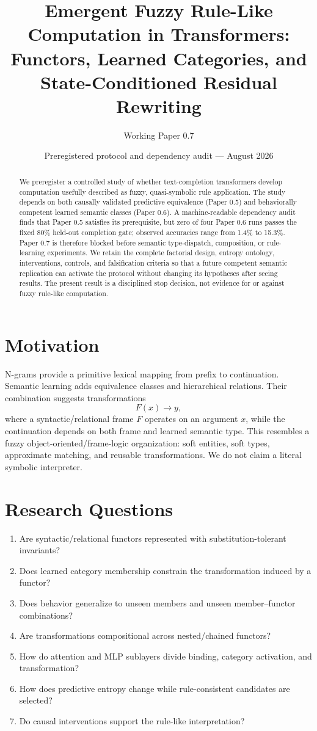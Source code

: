 \documentclass[11pt]{article}
\title{Emergent Fuzzy Rule-Like Computation in Transformers:\\Functors, Learned Categories, and State-Conditioned Residual Rewriting}
\author{Working Paper 0.7}
\date{Preregistered protocol and dependency audit --- August 2026}
\begin{document}
\maketitle
\begin{abstract}
We preregister a controlled study of whether text-completion transformers develop computation usefully described as fuzzy, quasi-symbolic rule application. The study depends on both causally validated predictive equivalence (Paper 0.5) and behaviorally competent learned semantic classes (Paper 0.6). A machine-readable dependency audit finds that Paper 0.5 satisfies its prerequisite, but zero of four Paper 0.6 runs passes the fixed 80\% held-out completion gate; observed accuracies range from 1.4\% to 15.3\%. Paper 0.7 is therefore blocked before semantic type-dispatch, composition, or rule-learning experiments. We retain the complete factorial design, entropy ontology, interventions, controls, and falsification criteria so that a future competent semantic replication can activate the protocol without changing its hypotheses after seeing results. The present result is a disciplined stop decision, not evidence for or against fuzzy rule-like computation.
\end{abstract}

\section{Motivation}
N-grams provide a primitive lexical mapping from prefix to continuation. Semantic learning adds equivalence classes and hierarchical relations. Their combination suggests transformations
\[
F(x)\rightarrow y,
\]
where a syntactic/relational frame $F$ operates on an argument $x$, while the continuation depends on both frame and learned semantic type. This resembles a fuzzy object-oriented/frame-logic organization: soft entities, soft types, approximate matching, and reusable transformations. We do not claim a literal symbolic interpreter.

\section{Research Questions}
\begin{enumerate}[label=RQ\arabic*.]
\item Are syntactic/relational functors represented with substitution-tolerant invariants?
\item Does learned category membership constrain the transformation induced by a functor?
\item Does behavior generalize to unseen members and unseen member--functor combinations?
\item Are transformations compositional across nested/chained functors?
\item How do attention and MLP sublayers divide binding, category activation, and transformation?
\item How does predictive entropy change while rule-consistent candidates are selected?
\item Do causal interventions support the rule-like interpretation?
\end{enumerate}
\end{document}
